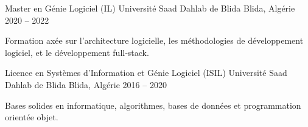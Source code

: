 \begin{cventries}
  \cventry
    {Master en Génie Logiciel (IL)}
    {Université Saad Dahlab de Blida}
    {Blida, Algérie}
    {2020 -- 2022}
    {
      \begin{cvitems}
        \item {Formation axée sur l'architecture logicielle, les méthodologies de développement logiciel, et le développement full‑stack.}
      \end{cvitems}
    }

  \cventry
    {Licence en Systèmes d'Information et Génie Logiciel (ISIL)}
    {Université Saad Dahlab de Blida}
    {Blida, Algérie}
    {2016 -- 2020}
    {
      \begin{cvitems}
        \item {Bases solides en informatique, algorithmes, bases de données et programmation orientée objet.}
      \end{cvitems}
    }
\end{cventries}